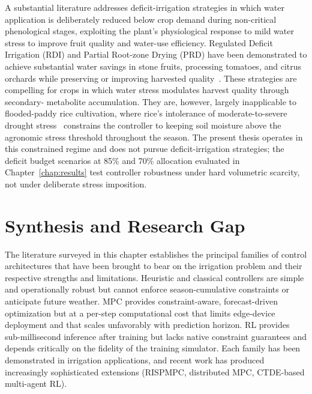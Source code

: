 A substantial literature addresses deficit-irrigation strategies in
which water application is deliberately reduced below crop demand
during non-critical phenological stages, exploiting the plant's
physiological response to mild water stress to improve fruit quality
and water-use efficiency. Regulated Deficit Irrigation (RDI) and
Partial Root-zone Drying (PRD) have been demonstrated to achieve
substantial water savings in stone fruits, processing tomatoes, and
citrus orchards while preserving or improving harvested
quality~\cite{Sharma2025}. These strategies are compelling for crops
in which water stress modulates harvest quality through secondary-
metabolite accumulation. They are, however, largely inapplicable to
flooded-paddy rice cultivation, where rice's intolerance of
moderate-to-severe drought stress~\cite{jalali2021,raoufi2025}
constrains the controller to keeping soil moisture above the
agronomic stress threshold throughout the season. The present thesis
operates in this constrained regime and does not pursue
deficit-irrigation strategies; the deficit budget scenarios at 85\%
and 70\% allocation evaluated in Chapter~\ref{chap:results} test
controller robustness under hard volumetric scarcity, not under
deliberate stress imposition.

\section{Synthesis and Research Gap}
\label{sec:lit-gap}

The literature surveyed in this chapter establishes the principal
families of control architectures that have been brought to bear on
the irrigation problem and their respective strengths and limitations.
Heuristic and classical controllers are simple and operationally
robust but cannot enforce season-cumulative constraints or anticipate
future weather. MPC provides constraint-aware, forecast-driven
optimization but at a per-step computational cost that limits
edge-device deployment and that scales unfavorably with prediction
horizon. RL provides sub-millisecond inference after training but
lacks native constraint guarantees and depends critically on the
fidelity of the training simulator. Each family has been demonstrated
in irrigation applications, and recent work has produced increasingly
sophisticated extensions (RISPMPC, distributed MPC, CTDE-based
multi-agent RL).

